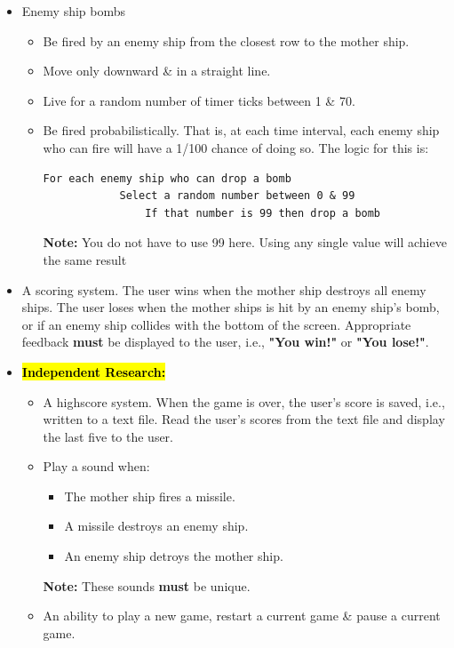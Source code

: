 \documentclass{article}
\begin{document}
\begin{itemize}
    \item Enemy ship bombs
    \begin{itemize}
        \item Be fired by an enemy ship from the closest row to the mother ship. 
        \item Move only downward \& in a straight line.
        \item Live for a random number of timer ticks between 1 \& 70.
        \item Be fired probabilistically. That is, at each time interval, each enemy ship who can fire will have a 1/100 chance of doing so. The logic for this is:
        \begin{Verbatim}[tabsize=2]
        For each enemy ship who can drop a bomb
            Select a random number between 0 & 99
                If that number is 99 then drop a bomb   
        \end{Verbatim}
        \textbf{Note:} You do not have to use 99 here. Using any single value will achieve the same result
    \end{itemize}
    \item A scoring system. The user wins when the mother ship destroys all enemy ships. The user loses when the mother ships is hit by an enemy ship's bomb, or if an enemy ship collides with the bottom of the screen. Appropriate feedback \textbf{must} be displayed to the user, i.e., \textbf{"You win!"} or \textbf{"You lose!"}.
    \item \hl{\textbf{Independent Research:}}
    \begin{itemize}
        \item A highscore system. When the game is over, the user's score is saved, i.e., written to a text file. Read the user's scores from the text file and display the last five to the user.
        \item Play a sound when:
        \begin{itemize}
            \item The mother ship fires a missile.
            \item A missile destroys an enemy ship.
            \item An enemy ship detroys the mother ship.
        \end{itemize}
        \textbf{Note:} These sounds \textbf{must} be unique.
        \item An ability to play a new game, restart a current game \& pause a current game.
    \end{itemize}
\end{itemize}
\end{document}
